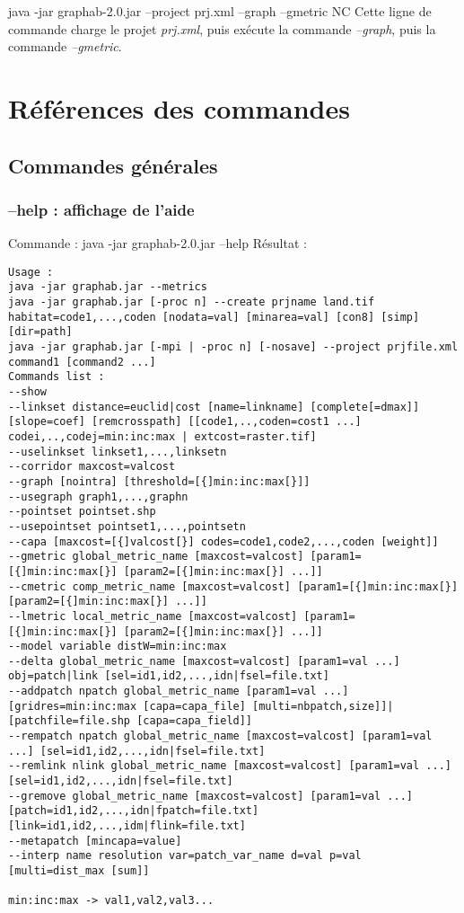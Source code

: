 \documentclass[a4paper,10pt]{report}
\newenvironment{cmd}
{\quote\Verbatim}
{\endVerbatim\endquote}
\begin{document}
\begin{cmd}
java -jar graphab-2.0.jar --project prj.xml --graph --gmetric NC  
\end{cmd}
Cette ligne de commande charge le projet \textit{prj.xml}, puis exécute la commande \textit{--graph}, puis la commande \textit{--gmetric}.


\chapter{Références des commandes}
\section{Commandes générales}
\subsection{--help : affichage de l'aide}
Commande :
\begin{cmd}
java -jar graphab-2.0.jar --help
\end{cmd}
Résultat :
\begin{verbatim}
Usage :
java -jar graphab.jar --metrics
java -jar graphab.jar [-proc n] --create prjname land.tif habitat=code1,...,coden [nodata=val] [minarea=val] [con8] [simp] [dir=path]
java -jar graphab.jar [-mpi | -proc n] [-nosave] --project prjfile.xml command1 [command2 ...]
Commands list :
--show
--linkset distance=euclid|cost [name=linkname] [complete[=dmax]] [slope=coef] [remcrosspath] [[code1,..,coden=cost1 ...] codei,..,codej=min:inc:max | extcost=raster.tif]
--uselinkset linkset1,...,linksetn
--corridor maxcost=valcost
--graph [nointra] [threshold=[{]min:inc:max[}]]
--usegraph graph1,...,graphn
--pointset pointset.shp
--usepointset pointset1,...,pointsetn
--capa [maxcost=[{]valcost[}] codes=code1,code2,...,coden [weight]]
--gmetric global_metric_name [maxcost=valcost] [param1=[{]min:inc:max[}] [param2=[{]min:inc:max[}] ...]]
--cmetric comp_metric_name [maxcost=valcost] [param1=[{]min:inc:max[}] [param2=[{]min:inc:max[}] ...]]
--lmetric local_metric_name [maxcost=valcost] [param1=[{]min:inc:max[}] [param2=[{]min:inc:max[}] ...]]
--model variable distW=min:inc:max
--delta global_metric_name [maxcost=valcost] [param1=val ...] obj=patch|link [sel=id1,id2,...,idn|fsel=file.txt]
--addpatch npatch global_metric_name [param1=val ...] [gridres=min:inc:max [capa=capa_file] [multi=nbpatch,size]]|[patchfile=file.shp [capa=capa_field]]
--rempatch npatch global_metric_name [maxcost=valcost] [param1=val ...] [sel=id1,id2,...,idn|fsel=file.txt]
--remlink nlink global_metric_name [maxcost=valcost] [param1=val ...] [sel=id1,id2,...,idn|fsel=file.txt]
--gremove global_metric_name [maxcost=valcost] [param1=val ...] [patch=id1,id2,...,idn|fpatch=file.txt] [link=id1,id2,...,idm|flink=file.txt]
--metapatch [mincapa=value]
--interp name resolution var=patch_var_name d=val p=val [multi=dist_max [sum]]

min:inc:max -> val1,val2,val3...
\end{verbatim}
\end{document}
